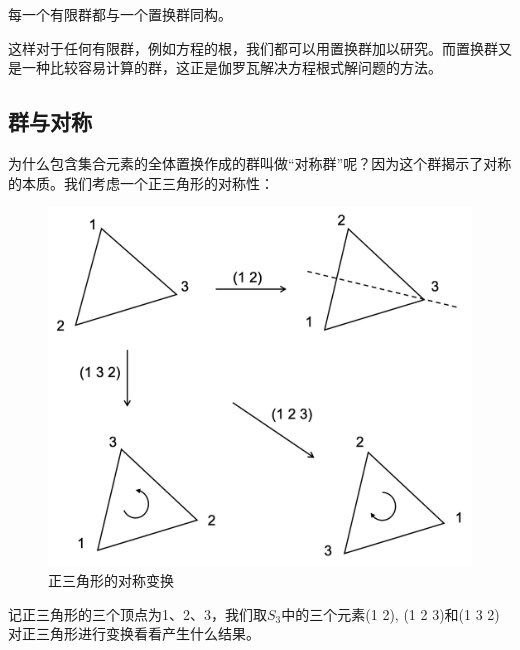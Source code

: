 \documentclass[b5paper]{ctexart}
\begin{document}
\begin{theorem}
每一个有限群都与一个置换群同构。
\end{theorem}

这样对于任何有限群，例如方程的根，我们都可以用置换群加以研究。而置换群又是一种比较容易计算的群，这正是伽罗瓦解决方程根式解问题的方法。

\begin{Exercise}
\end{Exercise}

\subsection{群与对称}

为什么包含集合元素的全体置换作成的群叫做“对称群”呢？因为这个群揭示了对称的本质。我们考虑一个正三角形的对称性：

\begin{figure}[htbp]
 \centering
 \includegraphics[scale=0.5]{img/s3-examples.png}
 \caption{正三角形的对称变换}
 \label{fig:S3-examples}
\end{figure}

记正三角形的三个顶点为1、2、3，我们取$S_3$中的三个元素(1 2), (1 2 3)和(1 3 2)对正三角形进行变换看看产生什么结果。
\end{document}
